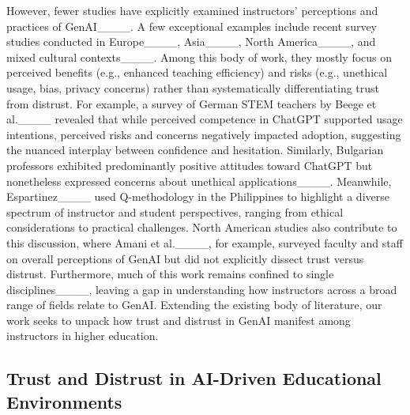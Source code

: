 However, fewer studies have explicitly examined instructors' perceptions and practices of GenAI____. A few exceptional examples include recent survey studies conducted in Europe____, Asia____, North America____, and mixed cultural contexts____. Among this body of work, they mostly focus on perceived benefits (e.g., enhanced teaching efficiency) and risks (e.g., unethical usage, bias, privacy concerns) rather than systematically differentiating trust from distrust. For example, a survey of German STEM teachers by Beege et al.____ revealed that while perceived competence in ChatGPT supported usage intentions, perceived risks and concerns negatively impacted adoption, suggesting the nuanced interplay between confidence and hesitation. Similarly, Bulgarian professors exhibited predominantly positive attitudes toward ChatGPT but nonetheless expressed concerns about unethical applications____. Meanwhile, Espartinez____ used Q-methodology in the Philippines to highlight a diverse spectrum of instructor and student perspectives, ranging from ethical considerations to practical challenges. North American studies also contribute to this discussion, where Amani et al.____, for example, surveyed faculty and staff on overall perceptions of GenAI but did not explicitly dissect trust versus distrust. Furthermore, much of this work remains confined to single disciplines____, leaving a gap in understanding how instructors across a broad range of fields relate to GenAI. Extending the existing body of literature, our work seeks to unpack how trust and distrust in GenAI manifest among instructors in higher education.


\subsection{Trust and Distrust in AI-Driven Educational Environments}

